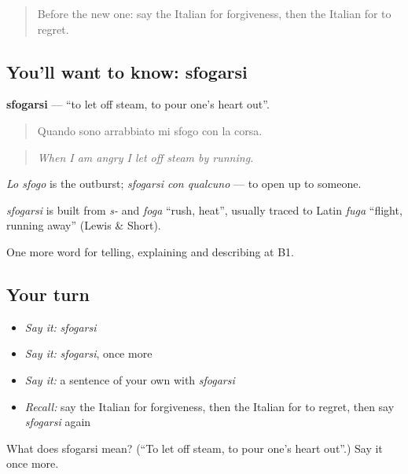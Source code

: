 \label{lesson:IT-C480-sfogarsi}



\begin{quote}
Before the new one: say the Italian for forgiveness, then the Italian for to regret.
\end{quote}

\subsection*{You'll want to know: sfogarsi}
\textbf{sfogarsi} — \textquotedblleft{}to let off steam, to pour one's heart out\textquotedblright{}.

\begin{quote}
Quando sono arrabbiato mi sfogo con la corsa.
\end{quote}

\begin{quote}
\emph{When I am angry I let off steam by running.}
\end{quote}

\emph{Lo sfogo} is the outburst; \emph{sfogarsi con qualcuno} — to open up to someone.

\begin{cousinweb}
\emph{sfogarsi} is built from \emph{s-} and \emph{foga} \textquotedblleft{}rush, heat\textquotedblright{}, usually traced to Latin \emph{fuga} \textquotedblleft{}flight, running away\textquotedblright{} (Lewis \& Short).
\end{cousinweb}

\begin{grammarlens}[title={What you've built}]
One more word for telling, explaining and describing at B1.
\end{grammarlens}

\subsection*{Your turn}
\begin{itemize}
\raggedright
  \item \emph{Say it:} \emph{sfogarsi}
  \item \emph{Say it:} \emph{sfogarsi}, once more
  \item \emph{Say it:} a sentence of your own with \emph{sfogarsi}
  \item \emph{Recall:} say the Italian for forgiveness, then the Italian for to regret, then say \emph{sfogarsi} again
\end{itemize}

\begin{tcolorbox}[breakable,colback=teal!4,colframe=teal!35!black,title={Before you move on}]
What does sfogarsi mean? (\textquotedblleft{}To let off steam, to pour one's heart out\textquotedblright{}.) Say it once more.
\end{tcolorbox}
